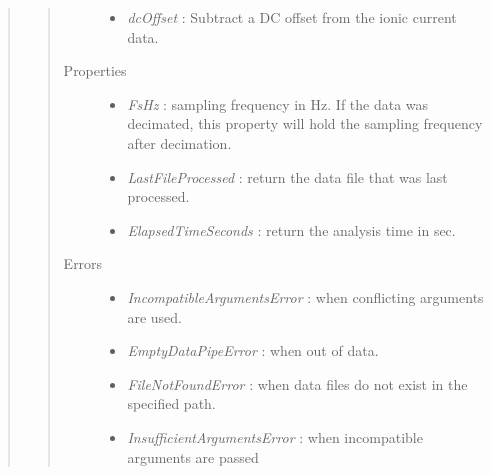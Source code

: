 \documentclass[letterpaper,10pt,english]{sphinxmanual}
\begin{document}
\begin{quote}
\begin{quote}
\begin{description}
\begin{itemize}
\item {} 
\emph{dcOffset} :          Subtract a DC offset from the ionic current data.

\end{itemize}

\item[{Properties}] \leavevmode\begin{itemize}
\item {} 
\emph{FsHz} :                                      sampling frequency in Hz. If the data was decimated, this property will hold the sampling frequency after decimation.

\item {} 
\emph{LastFileProcessed} :         return the data file that was last processed.

\item {} 
\emph{ElapsedTimeSeconds} :        return the analysis time in sec.

\end{itemize}

\item[{Errors}] \leavevmode\begin{itemize}
\item {} 
\emph{IncompatibleArgumentsError} :        when conflicting arguments are used.

\item {} 
\emph{EmptyDataPipeError} :                        when out of data.

\item {} 
\emph{FileNotFoundError} :                         when data files do not exist in the specified path.

\item {} 
\emph{InsufficientArgumentsError} :        when incompatible arguments are passed

\end{itemize}

\end{description}\end{quote}
\end{quote}
\end{document}
